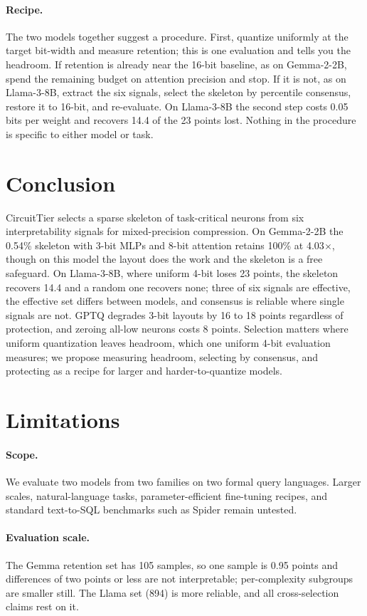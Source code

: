 \documentclass[11pt]{article}
\begin{document}
\paragraph{Recipe.}
The two models together suggest a procedure. First, quantize 
uniformly at the target bit-width and measure retention; this 
is one evaluation and tells you the headroom. If retention is 
already near the 16-bit baseline, as on Gemma-2-2B, spend the 
remaining budget on attention precision and stop. If it is 
not, as on Llama-3-8B, extract the six signals, select the 
skeleton by percentile consensus, restore it to 16-bit, and 
re-evaluate. On Llama-3-8B the second step costs 0.05 bits per 
weight and recovers 14.4 of the 23 points lost. Nothing in the 
procedure is specific to either model or task.


\section{Conclusion}
CircuitTier selects a sparse skeleton of task-critical neurons 
from six interpretability signals for mixed-precision 
compression. On Gemma-2-2B the 0.54\% skeleton with 3-bit MLPs 
and 8-bit attention retains 100\% at 4.03$\times$, though on 
this model the layout does the work and the skeleton is a free 
safeguard. On Llama-3-8B, where uniform 4-bit loses 23 points, 
the skeleton recovers 14.4 and a random one recovers none; 
three of six signals are effective, the effective set differs 
between models, and consensus is reliable where single signals 
are not. GPTQ degrades 3-bit layouts by 16 to 18 points 
regardless of protection, and zeroing all-low neurons costs 8 
points. Selection matters where uniform quantization leaves 
headroom, which one uniform 4-bit evaluation measures; we 
propose measuring headroom, selecting by consensus, and 
protecting as a recipe for larger and harder-to-quantize models.


\section*{Limitations}
\paragraph{Scope.} We evaluate two models from two families on 
two formal query languages. Larger scales, natural-language 
tasks, parameter-efficient fine-tuning recipes, and standard 
text-to-SQL benchmarks such as Spider remain untested.
\paragraph{Evaluation scale.} The Gemma retention set has 105 
samples, so one sample is 0.95 points and differences of two 
points or less are not interpretable; per-complexity subgroups 
are smaller still. The Llama set (894) is more reliable, and 
all cross-selection claims rest on it.
\end{document}
